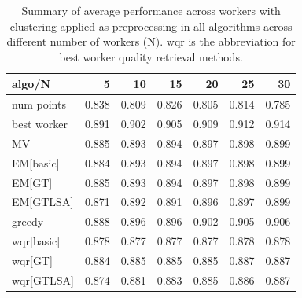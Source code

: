     \begin{table}[ht!]
    \small
    \setlength\tabcolsep{3pt}
    \begin{tabular}{lrrrrrr}
      \hline
       algo/N                  &     5 &    10 &    15 &    20 &    25 &    30 \\
      \hline
       num points           & 0.838 & 0.809 & 0.826 & 0.805 & 0.814 & 0.785 \\
       best worker          & 0.891 & 0.902 & 0.905 & 0.909 & 0.912 & 0.914 \\
       \hline
       MV                   & 0.885 & 0.893 & 0.894 & 0.897 & 0.898 & 0.899 \\
       EM[basic]           & 0.884 & 0.893 & 0.894 & 0.897 & 0.898 & 0.899 \\
       EM[GT]              & 0.885 & 0.893 & 0.894 & 0.897 & 0.898 & 0.899 \\
       EM[GTLSA]           & 0.871 & 0.892 & 0.891 & 0.896 & 0.897 & \cellcolor{blue!25} 0.899 \\
       greedy               & 0.888 & 0.896 & 0.896 & 0.902 & 0.905 & 0.906 \\
       wqr[basic]          & 0.878 & 0.877 & 0.877 & 0.877 & 0.878 & 0.878 \\
       wqr[GT]             & 0.884 & 0.885 & 0.885 & 0.885 & 0.887 & 0.887 \\
       wqr[GTLSA]          & 0.874 & 0.881 & 0.883 & 0.885 & 0.886 & \cellcolor{blue!25} 0.887 \\
      \hline
    \end{tabular}
    \caption{Summary of average performance across workers with clustering applied as preprocessing in all algorithms across different number of workers (N). wqr is the abbreviation for best worker quality retrieval methods.}
    \label{bigtable}
    \end{table}
